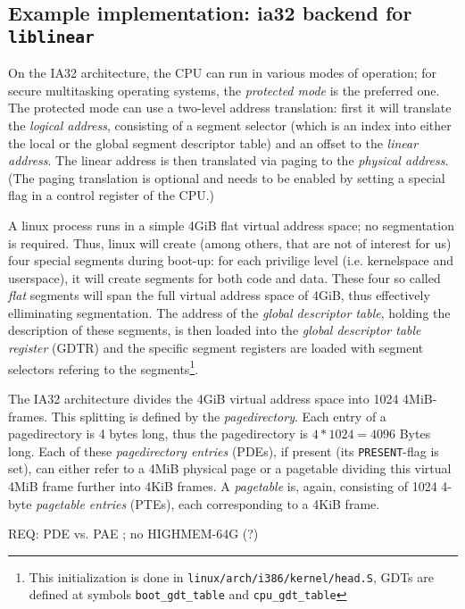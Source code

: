 \subsection{Example implementation: ia32 backend for \texttt{liblinear}}

On the IA32 architecture, the CPU can run in various modes of operation; for
secure multitasking operating systems, the \emph{protected mode} is the
preferred one.  The protected mode can use a two-level address translation:
first it will translate the \emph {logical address}, consisting of a segment
selector (which is an index into either the local or the global segment
descriptor table) and an offset to the \emph{linear address}.  The linear
address is then translated via paging to the \emph{physical address}. (The
paging translation is optional and needs to be enabled by setting a special flag
in a control register of the CPU.)

\label{linux_gdt} A linux process runs in a simple 4GiB flat virtual address
space; no segmentation is required. Thus, linux will create (among others, that
are not of interest for us) four special segments during boot-up: for each
privilige level (i.e. kernelspace and userspace), it will create segments for
both code and data. These four so called \emph{flat} segments will span the full
virtual address space of 4GiB, thus effectively elliminating segmentation. The
address of the \emph{global descriptor table}, holding the description of these
segments, is then loaded into the \emph{global descriptor table register} (GDTR)
and the specific segment registers are loaded with segment selectors refering to
the segments\footnote{This initialization is done in
\texttt{linux/arch/i386/kernel/head.S}, GDTs are defined at symbols
\texttt{boot\_gdt\_table} and \texttt{cpu\_gdt\_table}}.

The IA32 architecture divides the 4GiB virtual address space into 1024
4MiB-frames. This splitting is defined by the \emph{pagedirectory}. Each entry
of a pagedirectory is 4 bytes long, thus the pagedirectory is $4*1024 = 4096$
Bytes long. Each of these \emph{pagedirectory entries} (PDEs), if present (its
\texttt{PRESENT}-flag is set), can either refer to a 4MiB physical page or a
pagetable dividing this virtual 4MiB frame further into 4KiB frames. A
\emph{pagetable} is, again, consisting of 1024 4-byte \emph{pagetable entries}
(PTEs), each corresponding to a 4KiB frame.

REQ: PDE vs. PAE ; no HIGHMEM-64G (?)



